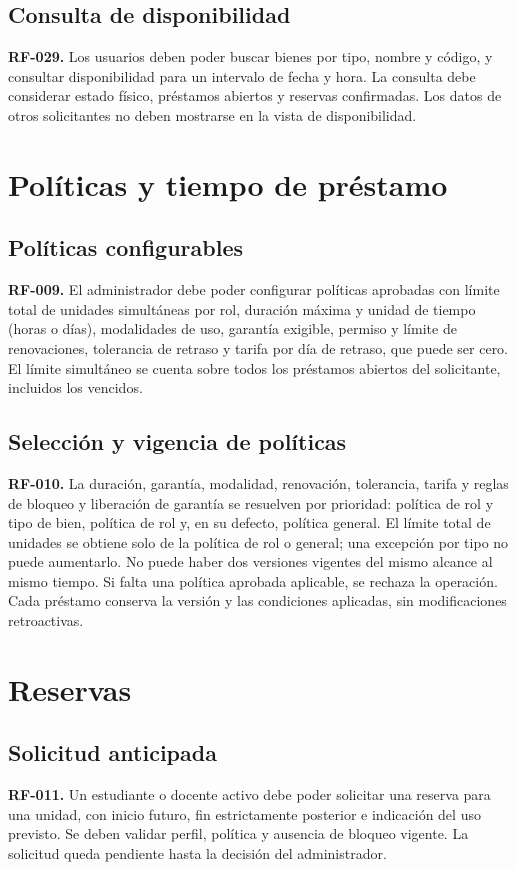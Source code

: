 \subsection{Consulta de disponibilidad}
\textbf{RF-029.} Los usuarios deben poder buscar bienes por tipo, nombre y c\'odigo, y consultar disponibilidad para un intervalo de fecha y hora. La consulta debe considerar estado f\'isico, pr\'estamos abiertos y reservas confirmadas. Los datos de otros solicitantes no deben mostrarse en la vista de disponibilidad.

\section{Pol\'iticas y tiempo de pr\'estamo}

\subsection{Pol\'iticas configurables}
\textbf{RF-009.} El administrador debe poder configurar pol\'iticas aprobadas con l\'imite total de unidades simult\'aneas por rol, duraci\'on m\'axima y unidad de tiempo (horas o d\'ias), modalidades de uso, garant\'ia exigible, permiso y l\'imite de renovaciones, tolerancia de retraso y tarifa por d\'ia de retraso, que puede ser cero. El l\'imite simult\'aneo se cuenta sobre todos los pr\'estamos abiertos del solicitante, incluidos los vencidos.

\subsection{Selecci\'on y vigencia de pol\'iticas}
\textbf{RF-010.} La duraci\'on, garant\'ia, modalidad, renovaci\'on, tolerancia, tarifa y reglas de bloqueo y liberaci\'on de garant\'ia se resuelven por prioridad: pol\'itica de rol y tipo de bien, pol\'itica de rol y, en su defecto, pol\'itica general. El l\'imite total de unidades se obtiene solo de la pol\'itica de rol o general; una excepci\'on por tipo no puede aumentarlo. No puede haber dos versiones vigentes del mismo alcance al mismo tiempo. Si falta una pol\'itica aprobada aplicable, se rechaza la operaci\'on. Cada pr\'estamo conserva la versi\'on y las condiciones aplicadas, sin modificaciones retroactivas.

\section{Reservas}

\subsection{Solicitud anticipada}
\textbf{RF-011.} Un estudiante o docente activo debe poder solicitar una reserva para una unidad, con inicio futuro, fin estrictamente posterior e indicaci\'on del uso previsto. Se deben validar perfil, pol\'itica y ausencia de bloqueo vigente. La solicitud queda pendiente hasta la decisi\'on del administrador.

